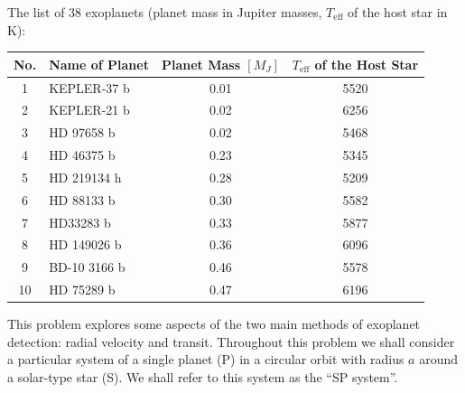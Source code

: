 \begin{description}
\end{description}

\medskip
\noindent The list of 38 exoplanets (planet mass in Jupiter masses,
$T_{\mathrm{eff}}$ of the host star in K):

\begin{center}
\begin{tabular}{clcc}
\toprule
No. & Name of Planet & Planet Mass $[M_J]$ & $T_{\mathrm{eff}}$ of the Host Star\\
\midrule
1 & KEPLER-37 b & 0.01 & 5520\\
2 & KEPLER-21 b & 0.02 & 6256\\
3 & HD 97658 b  & 0.02 & 5468\\
4 & HD 46375 b  & 0.23 & 5345\\
5 & HD 219134 h & 0.28 & 5209\\
6 & HD 88133 b  & 0.30 & 5582\\
7 & HD33283 b   & 0.33 & 5877\\
8 & HD 149026 b & 0.36 & 6096\\
9 & BD-10 3166 b & 0.46 & 5578\\
10 & HD 75289 b & 0.47 & 6196\\
\bottomrule
\end{tabular}
\end{center}


This problem explores some aspects of the two main methods of exoplanet
detection: radial velocity and transit. Throughout this problem we shall
consider a particular system of a single planet (P) in a circular orbit with
radius $a$ around a solar-type star (S). We shall refer to this system as the
``SP system''.

